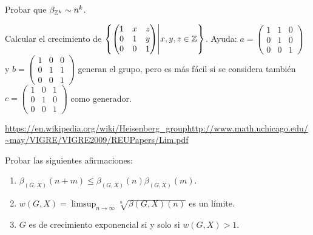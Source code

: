 \documentclass[twoside]{article}
\begin{document}
\begin{ejercicio}{2.1}
Probar que $\beta_{\mathbb{Z}^k}\sim n^k$.
\end{ejercicio}
\begin{solucion}

\end{solucion}

\newpage

\begin{ejercicio}{2.2}
Calcular el crecimiento de $\left\{\begin{pmatrix}
1 & x & z\\
0 & 1 & y\\
0 & 0 & 1
\end{pmatrix}\middle\vert x,y,z\in\mathbb{Z}\right\}$. Ayuda: $a=\begin{pmatrix}
1 & 1 & 0\\
0 & 1 & 0\\
0 & 0 & 1
\end{pmatrix}$ y $b=\begin{pmatrix}
1 & 0 & 0\\
0 & 1 & 1\\
0 & 0 & 1
\end{pmatrix}$ generan el grupo, pero es más fácil si se considera también $c=\begin{pmatrix}
1 & 0 & 1\\
0 & 1 & 0\\
0 & 0 & 1
\end{pmatrix}$ como generador. 
\end{ejercicio}
\begin{solucion}
\url{https://en.wikipedia.org/wiki/Heisenberg_group}\url{http://www.math.uchicago.edu/~may/VIGRE/VIGRE2009/REUPapers/Lim.pdf}
\end{solucion}

\newpage

\begin{ejercicio}{2.3}
Probar las siguientes afirmaciones:
\begin{enumerate}
\item $\beta_{(G,X)}(n+m)\leq \beta_{(G,X)}(n)\beta_{(G,X)}(m)$.
\item $w(G,X)=\limsup_{n\to \infty}\sqrt[n]{\beta(G,X)(n)}$ es un límite. 
\item $G$ es de crecimiento exponencial si y solo si $w(G,X)>1$.
\end{enumerate}
\end{ejercicio}
\begin{solucion}

\end{solucion}
\end{document}

